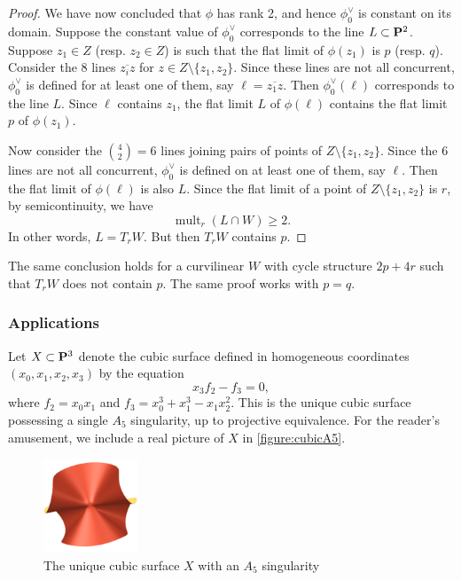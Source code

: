 \documentclass[12pt,reqno]{amsart}
\DeclareMathOperator{\mult}{mult}
\numberwithin{equation}{section}
\begin{document}
\begin{proof}
  We have now concluded that $\phi$ has rank 2, and hence $\phi_0^\vee$ is constant on its domain.
  Suppose the constant value of $\phi_0^\vee$ corresponds to the line $L \subset \P^2$.
  Suppose $z_1 \in Z$ (resp. $z_2 \in Z$) is such that the flat limit of $\phi(z_1)$ is $p$ (resp. $q$).
  Consider the 8 lines $\overline {z_i z}$ for $z \in Z \setminus \{z_1,z_2\}$.
  Since these lines are not all concurrent, $\phi_0^\vee$ is defined for at least one of them, say $\ell = \overline {z_1 z}$.
  Then $\phi^\vee_0(\ell)$ corresponds to the line $L$.
  Since $\ell$ contains $z_1$, the flat limit $L$ of $\phi(\ell)$ contains the flat limit $p$ of $\phi(z_1)$.

  Now consider the ${4 \choose 2} = 6$ lines joining pairs of points of $Z \setminus \{z_1,z_2\}$.
  Since the 6 lines are not all concurrent, $\phi_0^\vee$ is defined on at least one of them, say $\ell$.
  Then the flat limit of $\phi(\ell)$ is also $L$.
  Since the flat limit of a point of $Z \setminus \{z_1,z_2\}$ is $r$, by semicontinuity, we have
  \[ \mult_r(L \cap W) \geq 2.\]
  In other words, $L = T_rW$.
  But then $T_rW$ contains $p$.
\end{proof}
\begin{remark}\label{prop:2p4r}
  The same conclusion holds for a curvilinear $W$ with cycle structure $2p + 4r$ such that $T_rW$ does not contain $p$.
  The same proof works with $p = q$.
\end{remark}

\subsubsection{Applications}
Let $X \subset \P^{3}$ denote the cubic surface defined in homogeneous coordinates $\left(x_{0}, x_{1}, x_{2}, x_{3}\right)$ by the equation \[x_{3}f_{2} - f_{3} = 0,\] where $f_{2} = x_{0}x_{1}$ and $f_{3} = x_{0}^3 + x_{1}^{3}-x_{1}x_{2}^{2}$.
This is the unique cubic surface possessing a single $A_5$ singularity, up to projective equivalence.
For the reader's amusement, we include a real picture of $X$ in \autoref{figure:cubicA5}.
\begin{figure}
  \centering
  \includegraphics[width=0.25\textwidth]{cubicA5}
  \caption{The unique cubic surface $X$ with an $A_5$ singularity}
  \label{figure:cubicA5}
\end{figure}
\end{document}

